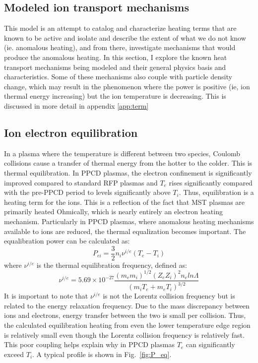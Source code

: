 \begin{refsection}
\section{Modeled ion transport mechanisms}
This model is an attempt to catalog and characterize heating terms that are known to be active and isolate and describe the extent of what we do not know (ie. anomalous heating), and from there, investigate mechanisms that would produce the anomalous heating. In this section, I explore the known heat transport mechanisms being modeled and their general physics basis and characteristics. Some of these mechanisms also couple with particle density change, which may result in the phenomenon where the power is positive (ie, ion thermal energy increasing) but the ion temperature is decreasing. This is discussed in more detail in appendix \ref{app:term}

\subsection{Ion electron equilibration}

In a plasma where the temperature is different between two species, Coulomb collisions cause a transfer of thermal energy from the hotter to the colder. This is thermal equilibration. In PPCD plasmas, the electron confinement is significantly improved compared to standard RFP plasmas and $T_e$ rises significantly compared with the pre-PPCD period to levels significantly above $T_i$. Thus, equilibration is a heating term for the ions. This is a reflection of the fact that MST plasmas are primarily heated Ohmically, which is nearly entirely an electron heating mechanism. Particularly in PPCD plasmas, where anomalous heating mechanisms available to ions are reduced, the thermal equalization becomes important. The equalibration power can be calculated as\cite{Braginskii1965}:
\begin{equation}
    P_{ei} = \frac{3}{2}n_i\nu^{i/e}(T_e - T_i)
\end{equation}
where $\nu^{i/e}$ is the thermal equilibration frequency, defined as\cite{Greene1973}:
\begin{equation}
    \nu^{i/e} = 5.69\times10^{-27}\frac{(m_e m_i)^{1/2}(Z_e Z_i)^{2} n_e ln \Lambda}{(m_iT_e + m_eT_i)^{3/2}}
\end{equation}
It is important to note that $\nu^{i/e}$ is not the Lorentz collision frequency but is related to the energy relaxation frequency. Due to the mass discrepancy between ions and electrons, energy transfer between the two is small per collision. Thus, the calculated equilibration heating from even the lower temperature edge region is relatively small even though the Lorentz collision frequency is relatively fast. This poor coupling helps explain why in PPCD plasmas $T_e$ can significantly exceed $T_i$. A typical profile is shown in Fig.~\ref{fig:P_eq}.


\end{refsection}
